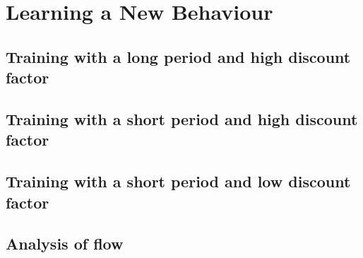 \section{Learning a New Behaviour}
\subsection{Training with a long period and high discount factor}
\subsection{Training with a short period and high discount factor}
\subsection{Training with a short period and low discount factor}
\subsection{Analysis of flow}
